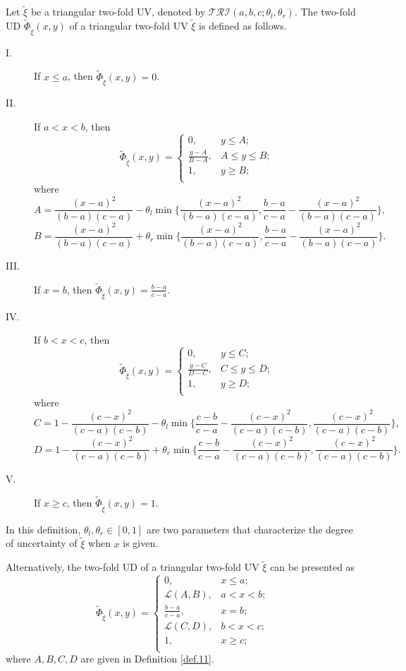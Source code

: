 \begin{definition}\label{def.11}
	Let  $\tilde{\xi}$ be a triangular two-fold UV, denoted by $\mathcal{TRI}(a,b,c;\theta_l,\theta_r)$. The two-fold UD $\tilde{\Phi}_{\tilde{\xi}}(x,y)$ of a triangular two-fold UV $\tilde{\xi}$ is defined as follows.
	\begin{description}
		\item[I.] If $x \leq a$, then $\tilde{\Phi}_{\tilde{\xi}}(x,y)=0$.
		\item[II.] If $a<x<b$, then
	\[\tilde{\Phi}_{\tilde{\xi}}(x,y)=\left\{
	\begin{array}{ll}
		0, & y\leq A;\\
		\frac{y-A}{B-A}, & A\leq y\leq B;\\
		1, & y \geq B;\\
	\end{array}
	\right.
	\]
	where $$A=\frac{(x-a)^2}{(b-a)(c-a)}-\theta_l\min\bigg\{\frac{(x-a)^2}{(b-a)(c-a)},\frac{b-a}{c-a}-\frac{(x-a)^2}{(b-a)(c-a)}\bigg\},$$  $$B=\frac{(x-a)^2}{(b-a)(c-a)}+\theta_r\min\bigg\{\frac{(x-a)^2}{(b-a)(c-a)},\frac{b-a}{c-a}-\frac{(x-a)^2}{(b-a)(c-a)}\bigg\}.$$
	\item[III.] If $x =b$, then $\tilde{\Phi}_{\tilde{\xi}}(x,y)=\frac{b-a}{c-a}$.
	\item[IV.] If $b<x<c$, then
	\[\tilde{\Phi}_{\tilde{\xi}}(x,y)=\left\{
	\begin{array}{ll}
		0, & y\leq C;\\
		\frac{y-C}{D-C}, & C\leq y\leq D;\\
		1, & y \geq D;\\
	\end{array}
	\right.
	\]
	where $$C=1-\frac{(c-x)^2}{(c-a)(c-b)}-\theta_l\min\bigg\{\frac{c-b}{c-a}-\frac{(c-x)^2}{(c-a)(c-b)}, \frac{(c-x)^2}{(c-a)(c-b)}\bigg\},$$  $$D=1-\frac{(c-x)^2}{(c-a)(c-b)}+\theta_r\min\bigg\{\frac{c-b}{c-a}-\frac{(c-x)^2}{(c-a)(c-b)}, \frac{(c-x)^2}{(c-a)(c-b)}\bigg\}.$$
	\item[V.] If $x \geq c$, then $\tilde{\Phi}_{\tilde{\xi}}(x,y)=1$.
\end{description}
\par In this definition, $\theta_l, \theta_r \in [0,1]$ are two parameters that characterize the degree of uncertainty of $\tilde{\xi}$ when $x$ is given.
\end{definition}
\begin{remark}
	Alternatively, the two-fold UD of a triangular two-fold UV $\tilde{\xi}$ can be presented as 
		\[\tilde{\Phi}_{\tilde{\xi}}(x,y)=\left\{
	\begin{array}{ll}
		0, & x\leq a;\\
		\mathcal{L}(A,B), & a< x< b;\\
		\frac{b-a}{c-a}, & x=b;\\
		\mathcal{L}(C,D), & b< x< c;\\
		1, & x\geq c;\\
	\end{array}
	\right.
	\]
	where $A,B,C,D$ are given in Definition \ref{def.11}.
	\end{remark}
